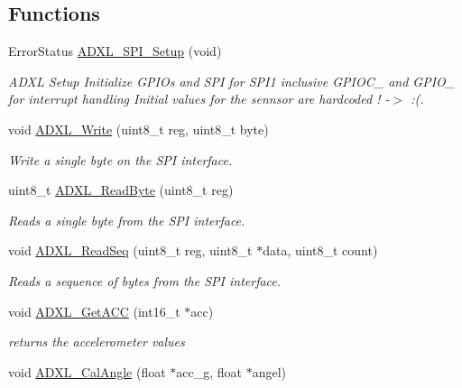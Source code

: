 \subsection*{Functions}
\begin{DoxyCompactItemize}
\item 
ErrorStatus \hyperlink{group___a_d_x_l345_ga515be22246de406138aac81725b02417}{ADXL\_\-SPI\_\-Setup} (void)
\begin{DoxyCompactList}\small\item\em ADXL Setup Initialize GPIOs and SPI for SPI1 inclusive GPIOC\_ and GPIO\_ for interrupt handling Initial values for the sennsor are hardcoded ! -\/$>$ :(. \item\end{DoxyCompactList}\item 
void \hyperlink{group___a_d_x_l345_ga710915ed3d25d6821df88efd3fa9b9e8}{ADXL\_\-Write} (uint8\_\-t reg, uint8\_\-t byte)
\begin{DoxyCompactList}\small\item\em Write a single byte on the SPI interface. \item\end{DoxyCompactList}\item 
uint8\_\-t \hyperlink{group___a_d_x_l345_gacd4a7e2d0b4fa4dcd452069caf32e060}{ADXL\_\-ReadByte} (uint8\_\-t reg)
\begin{DoxyCompactList}\small\item\em Reads a single byte from the SPI interface. \item\end{DoxyCompactList}\item 
void \hyperlink{group___a_d_x_l345_gade610253fb1631ecf23a9011e83748eb}{ADXL\_\-ReadSeq} (uint8\_\-t reg, uint8\_\-t $\ast$data, uint8\_\-t count)
\begin{DoxyCompactList}\small\item\em Reads a sequence of bytes from the SPI interface. \item\end{DoxyCompactList}\item 
void \hyperlink{group___a_d_x_l345_gaa19db377b2af2dbe1bfdcf3acc7baf2b}{ADXL\_\-GetACC} (int16\_\-t $\ast$acc)
\begin{DoxyCompactList}\small\item\em returns the accelerometer values \item\end{DoxyCompactList}\item 
void \hyperlink{group___a_d_x_l345_ga7468e213fa5c879ab0150b6f7bd55dff}{ADXL\_\-CalAngle} (float $\ast$acc\_\-g, float $\ast$angel)

\end{DoxyCompactItemize}

